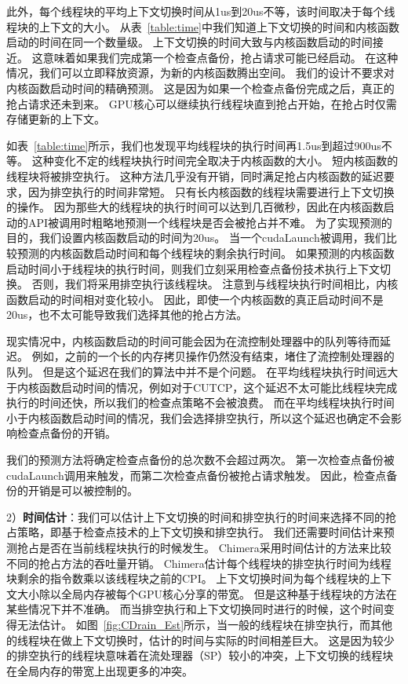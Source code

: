 此外，每个线程块的平均上下文切换时间从1us到20us不等，该时间取决于每个线程块的上下文的大小。
从表~\ref{table:time}中我们知道上下文切换的时间和内核函数启动的时间在同一个数量级。
上下文切换的时间大致与内核函数启动的时间接近。
这意味着如果我们完成第一个检查点备份，抢占请求可能已经启动。
在这种情况，我们可以立即释放资源，为新的内核函数腾出空间。
我们的设计不要求对内核函数启动时间的精确预测。
这是因为如果一个检查点备份完成之后，真正的抢占请求还未到来。
GPU核心可以继续执行线程块直到抢占开始，在抢占时仅需存储更新的上下文。

如表~\ref{table:time}所示，我们也发现平均线程块的执行时间再1.5us到超过900us不等。
这种变化不定的线程块执行时间完全取决于内核函数的大小。
短内核函数的线程块将被排空执行。
这种方法几乎没有开销，同时满足抢占内核函数的延迟要求，因为排空执行的时间非常短。
只有长内核函数的线程块需要进行上下文切换的操作。
因为那些大的线程块的执行时间可以达到几百微秒，因此在内核函数启动的API被调用时粗略地预测一个线程块是否会被抢占并不难。
为了实现预测的目的，我们设置内核函数启动的时间为20us。
当一个cudaLaunch被调用，我们比较预测的内核函数启动时间和每个线程块的剩余执行时间。
如果预测的内核函数启动时间小于线程块的执行时间，则我们立刻采用检查点备份技术执行上下文切换。
否则，我们将采用排空执行该线程块。
注意到与线程块执行时间相比，内核函数启动的时间相对变化较小。
因此，即使一个内核函数的真正启动时间不是20us，也不太可能导致我们选择其他的抢占方法。

现实情况中，内核函数启动的时间可能会因为在流控制处理器中的队列等待而延迟。
例如，之前的一个长的内存拷贝操作仍然没有结束，堵住了流控制处理器的队列。
但是这个延迟在我们的算法中并不是个问题。
在平均线程块执行时间远大于内核函数启动时间的情况，例如对于CUTCP，这个延迟不太可能比线程块完成执行的时间还快，所以我们的检查点策略不会被浪费。
而在平均线程块执行时间小于内核函数启动时间的情况，我们会选择排空执行，所以这个延迟也确定不会影响检查点备份的开销。

我们的预测方法将确定检查点备份的总次数不会超过两次。
第一次检查点备份被cudaLaunch调用来触发，而第二次检查点备份被抢占请求触发。
因此，检查点备份的开销是可以被控制的。

2）\textbf{时间估计}：我们可以估计上下文切换的时间和排空执行的时间来选择不同的抢占策略，即基于检查点技术的上下文切换和排空执行。
我们还需要时间估计来预测抢占是否在当前线程块执行的时候发生。
Chimera采用时间估计的方法来比较不同的抢占方法的吞吐量开销。
Chimera估计每个线程块的排空执行时间为线程块剩余的指令数乘以该线程块之前的CPI。
上下文切换时间为每个线程块的上下文大小除以全局内存被每个GPU核心分享的带宽。
但是这种基于线程块的方法在某些情况下并不准确。
而当排空执行和上下文切换同时进行的时候，这个时间变得无法估计。
如图~\ref{fig:CDrain_Est}所示，当一般的线程块在排空执行，而其他的线程块在做上下文切换时，估计的时间与实际的时间相差巨大。
这是因为较少的排空执行的线程块意味着在流处理器（SP）较小的冲突，上下文切换的线程块在全局内存的带宽上出现更多的冲突。


